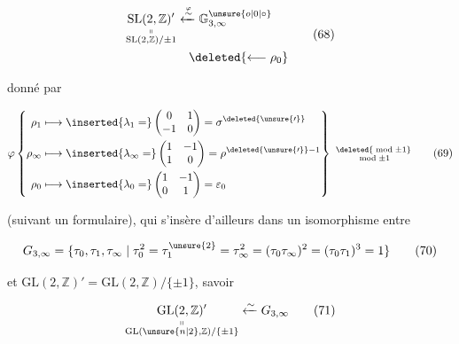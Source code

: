 

\[
\begin{aligned}
\underset{\substack{\shortparallel\\\mathrm{SL}(2,\mathbb{Z})/{\pm1}}}{\mathrm{SL}(2,\mathbb{Z})'}&\xleftarrow{\overset{\varphi}{\sim}}\mathbb{G}^{\unsure{o|0|\circ}}_{3,\infty}\\
&\quad\deleted{\longleftarrow\rho_0}
\end{aligned}\tag*{(68)}
\]

donné par

\[
\varphi\left\{\begin{aligned}
\rho_1&\longmapsto\inserted{\lambda_1=}\begin{pmatrix}0&1\\-1&0\end{pmatrix}=\sigma^{\deleted{\unsure{\prime}}}\\
\rho_\infty&\longmapsto\inserted{\lambda_\infty=}\begin{pmatrix}1&-1\\1&0\end{pmatrix}=\rho^{\deleted{\unsure{\prime}}-1}\\
\rho_0&\longmapsto\inserted{\lambda_0=}\begin{pmatrix}1&-1\\0&1\end{pmatrix}=\varepsilon_0
\end{aligned}\right\}\ \substack{\deleted{\bmod{\pm1}}\\\bmod{\pm1}}\tag*{(69)}
\]

(suivant un formulaire), qui s'insère d'ailleurs dans un isomorphisme entre

\[
G_{3,\infty}=\{\tau_0,\tau_1,\tau_\infty\mid\tau_0^2=\tau_1^{\unsure{2}}=\tau_\infty^2=(\tau_0\tau_\infty)^2=(\tau_0\tau_1)^3=1\}\tag*{(70)}
\]


et $\mathrm{GL}(2,\mathbb{Z})'=\mathrm{GL}(2,\mathbb{Z})/\{\pm1\}$, savoir

\[
\underset{\substack{\shortparallel\\\mathrm{GL}(\unsure{n|2},\mathbb{Z})/\{\pm1\}}}{\mathrm{GL}(2,\mathbb{Z})'}\xleftarrow{\sim}G_{3,\infty}\tag*{(71)}
\]

